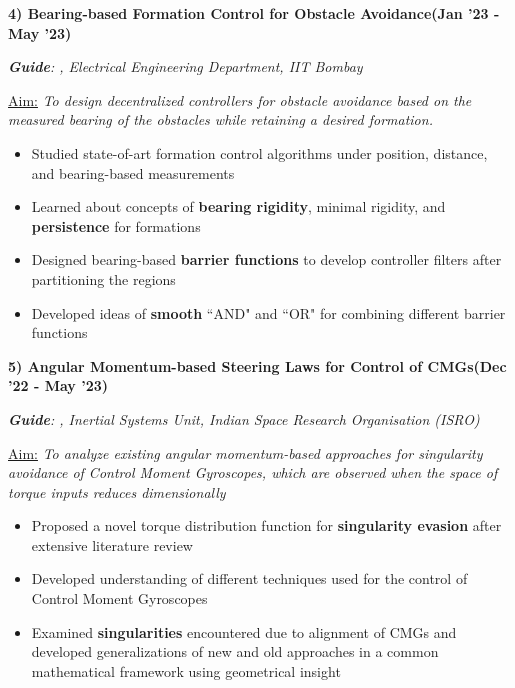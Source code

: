 \documentclass[10pt,letterpaper,sans]{moderncv}        %
\newcommand\x{1}
\newcommand\y{4}
\begin{document}
\hrulefill{}
\vspace{\y pt}

\textbf{4) Bearing-based Formation Control for Obstacle Avoidance}\hfill{\textbf{(Jan '23 - May '23)}}

\textit{\textbf{Guide}: , Electrical Engineering Department, IIT Bombay} 

\vspace{\x pt}

\textcolor{mygray}{
\underline{Aim:}
\textit{To design decentralized controllers for obstacle avoidance based on the measured bearing of the obstacles while retaining a desired formation.}%
}\vspace{\x pt}
\begin{itemize}
\item Studied state-of-art formation control algorithms under position, distance, and bearing-based measurements
\item Learned about concepts of \textbf{bearing rigidity}, minimal rigidity, and \textbf{persistence} for formations
\item Designed bearing-based \textbf{barrier functions} to develop controller filters after partitioning the regions
\item Developed ideas of \textbf{smooth} ``AND" and ``OR" for combining different barrier functions
\end{itemize}



\textbf{5) Angular Momentum-based Steering Laws for Control of CMGs}\hfill{\textbf{(Dec '22 - May '23)}}

\textit{\textbf{Guide}: , Inertial Systems Unit, Indian Space Research Organisation (ISRO)} 

\vspace{\x pt}

\textcolor{mygray}{
\underline{Aim:}
\textit{To analyze existing angular momentum-based approaches for singularity avoidance of Control Moment Gyroscopes, which are observed when the space of torque inputs reduces dimensionally}
}\vspace{\x pt}
\begin{itemize}
    \item Proposed a novel torque distribution function for \textbf{singularity evasion} after extensive literature review
    \item Developed understanding of different techniques used for the control of Control Moment Gyroscopes
    \item Examined \textbf{singularities} encountered due to alignment of CMGs and developed generalizations of new and old approaches in a common mathematical framework using geometrical insight
\end{itemize}
\end{document}
